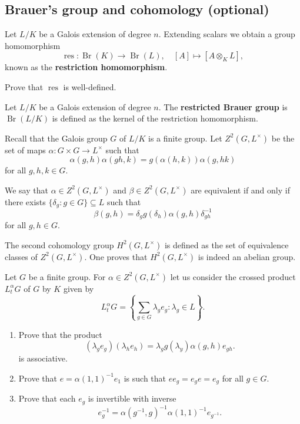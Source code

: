 \subsection{Brauer's group and cohomology (optional)}

Let $L/K$ be a Galois extension of degree $n$.  
Extending scalars we obtain a group homomorphism
\[
    \operatorname{res}\colon\operatorname{Br}(K)\to\operatorname{Br}(L),\quad
    [A]\mapsto [A\otimes_KL],
\]
known as the \textbf{restriction homomorphism}. 

\begin{exercise}
    Prove that $\operatorname{res}$ is well-defined.
\end{exercise}

\begin{definition}
    Let $L/K$ be a Galois extension of degree $n$. 
    The \textbf{restricted Brauer group} is $\operatorname{Br}(L/K)$ is defined
    as the kernel of the restriction homomorphism. 
\end{definition}


Recall that the Galois group $G$ of $L/K$ is a finite group. Let 
$Z^2(G,L^{\times})$ be the set of maps $\alpha\colon G\times G\to L^{\times}$
such that 
\[
\alpha(g,h)\alpha(gh,k)=g(\alpha(h,k))\alpha(g,hk)
\]
for all $g,h,k\in G$. 

We say that 
$\alpha\in Z^2(G,L^{\times})$ and $\beta\in Z^2(G,L^{\times})$ 
are equivalent if and only if
there exists $\{\delta_g:g\in G\}\subseteq L$ such that 
\[
\beta(g,h)=\delta_gg(\delta_h)\alpha(g,h)\delta^{-1}_{gh}
\]
for all $g,h\in G$. 

The second cohomology group $H^2(G,L^{\times})$ is defined as the
set of equivalence classes of $Z^2(G,L^{\times})$. One proves that
$H^2(G,L^{\times})$ is indeed an abelian group. 

\begin{exercise}
Let $G$ be a finite group. 
For $\alpha\in Z^2(G,L^{\times})$ let us consider the 
crossed product $L_t^{\alpha}G$ of $G$ by $K$ 
given by 
\[
L_t^{\alpha}G=\left\{\sum_{g\in G}\lambda_ge_g:\lambda_g\in L\right\}.
\]
\begin{enumerate}
    \item Prove that the product 
\[
    (\lambda_ge_g)(\lambda_he_h)=\lambda_gg(\lambda_y)\alpha(g,h)e_{gh}.
\]
is associative. 
\item Prove that $e=\alpha(1,1)^{-1}e_1$ is such that 
$ee_g=e_ge=e_g$ for all $g\in G$. 
\item Prove that 
each $e_g$ is invertible with inverse 
\[
e_g^{-1}=\alpha(g^{-1},g)^{-1}\alpha(1,1)^{-1}e_{g^{-1}}.
\]
\end{enumerate}
\end{exercise}

